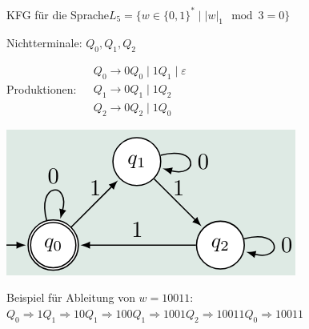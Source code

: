 \begin{example2}{KFG für die Sprache}$L_5=\{w \in\{0,1\}^* \mid |w|_1 \mod 3=0\}$

    \begin{minipage}{0.6\linewidth}
    Nichtterminale: $Q_0, Q_1, Q_2$

    Produktionen:
    $
    \begin{aligned}
    & Q_0 \rightarrow 0 Q_0 \mid 1 Q_1 \mid \varepsilon \\
    & Q_1 \rightarrow 0 Q_1 \mid 1 Q_2 \\
    & Q_2 \rightarrow 0 Q_2 \mid 1 Q_0
    \end{aligned}
    $
    \end{minipage}
    \begin{minipage}{0.39\linewidth}
        \includegraphics[width=1\linewidth]{kfg_reg.png}
    \end{minipage}

    \vspace{1mm}

Beispiel für Ableitung von $w=10011$:
$
Q_0 \Rightarrow 1 Q_1 \Rightarrow 10 Q_1 \Rightarrow 100 Q_1 \Rightarrow 1001 Q_2 \Rightarrow 10011 Q_0 \Rightarrow 10011
$ 
\end{example2}
